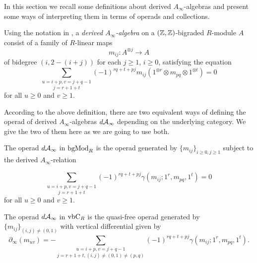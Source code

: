 \documentclass[join.tex]{subfiles}
\begin{document}
In this section we recall some definitions about derived $A_\infty$-algebras and present some ways of interpreting them in terms of operads and collections.

  \begin{defin}
  Using the notation in \cite{RW}, a \emph{derived $A_\infty$-algebra} on a $(\mathbb{Z},\mathbb{Z})$-bigraded $R$-module $A$ consist of a family of $R$-linear maps 
\[m_{ij}:A^{\otimes j}\to A\]
of bidegree $(i,2-(i+j))$ for each $j\geq 1$, $i\geq 0$, satisfying the equation
\[\underset{j=r+1+t}{\sum_{u=i+p, v=j+q-1}}(-1)^{rq+t+pj}m_{ij}(1^{\otimes r}\otimes m_{pq}\otimes 1^{\otimes t})=0\]
for all $u\geq 0$ and $v\geq 1$. 
\end{defin}

According to the above definition, there are two equivalent ways of defining the operad of derived $A_\infty$-algebras $d\mathcal{A}_\infty$ depending on the underlying category. We give the two of them here as we are going to use both.

\begin{defin}
The operad $d\mathcal{A}_\infty$ in $\mathrm{bgMod}_R$ is the operad generated by $\{m_{ij}\}_{i\geq 0,j\geq 1}$ subject to the derived $A_\infty$-relation

\[\underset{j=r+1+t}{\sum_{u=i+p, v=j+q-1}}(-1)^{rq+t+pj}\gamma(m_{ij};1^{ r}, m_{pq}, 1^{t})=0\]
for all $u\geq 0$ and $v\geq 1$. 

The operad $d\mathcal{A}_\infty$ in $\mathrm{vbC}_R$ is the quasi-free operad generated by $\{m_{ij}\}_{(i,j)\neq (0,1)}$ with vertical differential given by
\[\partial_\infty(m_{uv})=-\underset{j=r+1+t, (i,j)\neq (0,1)\neq (p,q)}{\sum_{u=i+p, v=j+q-1}}(-1)^{rq+t+pj}\gamma(m_{ij};1^{ r}, m_{pq}, 1^{t}).\]
\end{defin}
\end{document}
